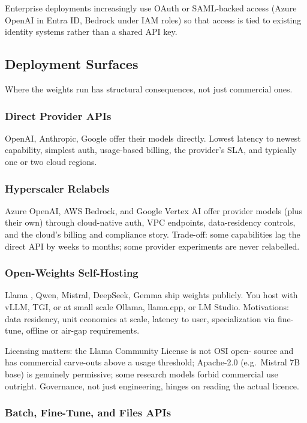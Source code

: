 Enterprise deployments increasingly use OAuth or SAML-backed
access (Azure OpenAI in Entra ID, Bedrock under IAM roles) so
that access is tied to existing identity systems rather than a
shared API key.

\subsection{Deployment Surfaces}

Where the weights run has structural consequences, not just
commercial ones.

\subsubsection{Direct Provider APIs}

OpenAI, Anthropic, Google offer their models directly. Lowest
latency to newest capability, simplest auth, usage-based billing,
the provider's SLA, and typically one or two cloud regions.

\subsubsection{Hyperscaler Relabels}

Azure OpenAI, AWS Bedrock, and Google Vertex AI offer provider
models (plus their own) through cloud-native auth, VPC
endpoints, data-residency controls, and the cloud's billing and
compliance story. Trade-off: some capabilities lag the direct
API by weeks to months; some provider experiments are never
relabelled.

\subsubsection{Open-Weights Self-Hosting}

Llama \citep{touvron2023llama2}, Qwen, Mistral, DeepSeek, Gemma
ship weights publicly. You host with vLLM, TGI, or at small scale
Ollama, llama.cpp, or LM Studio. Motivations: data residency,
unit economics at scale, latency to user, specialization via
fine-tune, offline or air-gap requirements.

Licensing matters: the Llama Community License is not OSI open-
source and has commercial carve-outs above a usage threshold;
Apache-2.0 (e.g.\ Mistral 7B base) is genuinely permissive; some
research models forbid commercial use outright. Governance, not
just engineering, hinges on reading the actual licence.

\subsubsection{Batch, Fine-Tune, and Files APIs}

